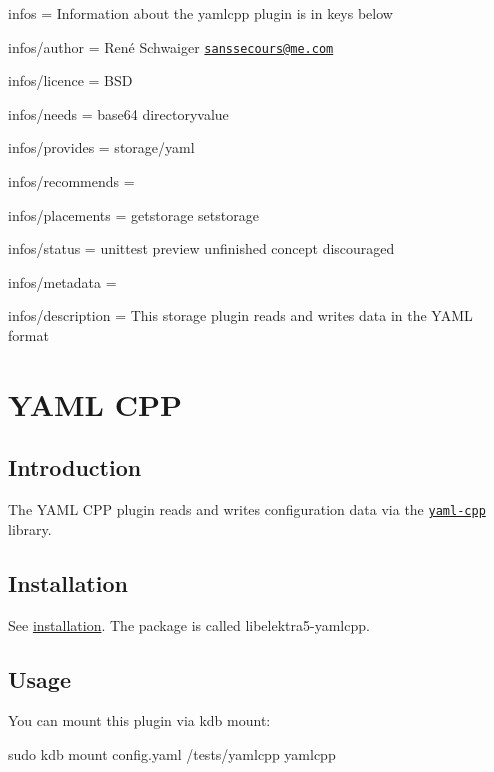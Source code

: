 
\begin{DoxyItemize}
\item infos = Information about the yamlcpp plugin is in keys below
\item infos/author = René Schwaiger \href{mailto:sanssecours@me.com}{\tt sanssecours@me.\+com}
\item infos/licence = B\+SD
\item infos/needs = base64 directoryvalue
\item infos/provides = storage/yaml
\item infos/recommends =
\item infos/placements = getstorage setstorage
\item infos/status = unittest preview unfinished concept discouraged
\item infos/metadata =
\item infos/description = This storage plugin reads and writes data in the Y\+A\+ML format
\end{DoxyItemize}\hypertarget{autotoc_md817_src_plugins_yamlcpp_README_md}{}\section{Y\+A\+M\+L C\+PP}\label{autotoc_md817_src_plugins_yamlcpp_README_md}
\hypertarget{autotoc_md817_autotoc_md818}{}\subsection{Introduction}\label{autotoc_md817_autotoc_md818}
The Y\+A\+ML C\+PP plugin reads and writes configuration data via the \href{https://github.com/jbeder/yaml-cpp}{\tt yaml-\/cpp} library.\hypertarget{autotoc_md817_autotoc_md819}{}\subsection{Installation}\label{autotoc_md817_autotoc_md819}
See \hyperlink{doc_INSTALL_md}{installation}. The package is called {\ttfamily libelektra5-\/yamlcpp}.\hypertarget{autotoc_md817_autotoc_md820}{}\subsection{Usage}\label{autotoc_md817_autotoc_md820}
You can mount this plugin via {\ttfamily kdb mount}\+:


\begin{DoxyCode}
sudo kdb mount config.yaml /tests/yamlcpp yamlcpp
\end{DoxyCode}


